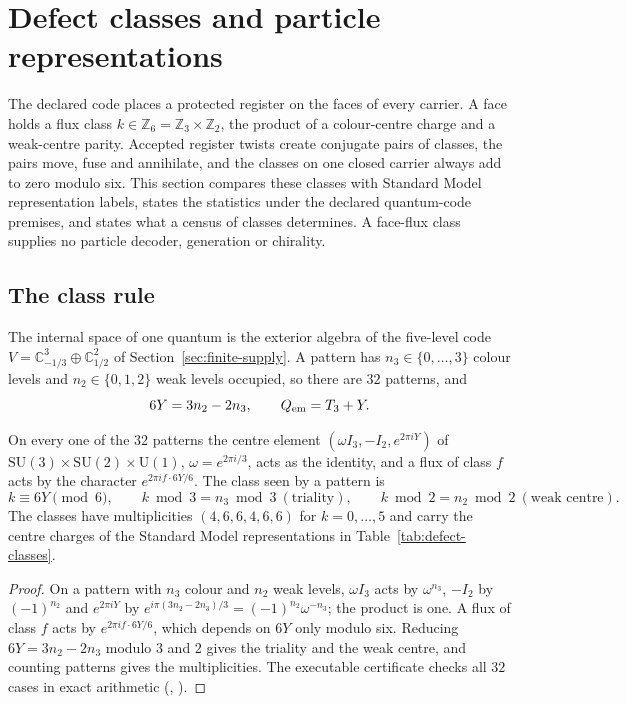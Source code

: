 \section{Defect classes and particle representations}
\label{sec:defect-particle-classes}

The declared code places a protected register on the faces of every carrier. A face holds a
flux class $k\in\mathbb Z_6=\mathbb Z_3\times\mathbb Z_2$, the product of a
colour-centre charge and a weak-centre parity. Accepted register twists create
conjugate pairs of classes, the pairs move, fuse and annihilate, and the classes on one
closed carrier always add to zero modulo six. This section compares these classes with
Standard Model representation labels, states the statistics under the declared
quantum-code premises, and states what a census of classes determines. A face-flux class
supplies no particle decoder, generation or chirality.

\subsection{The class rule}

The internal space of one quantum is the exterior algebra of the five-level code
$V=\mathbb C^3_{-1/3}\oplus\mathbb C^2_{1/2}$ of Section~\ref{sec:finite-supply}. A
pattern has $n_3\in\{0,\dots,3\}$ colour levels and $n_2\in\{0,1,2\}$ weak levels
occupied, so there are $32$ patterns, and
\[
 6Y=3n_2-2n_3,\qquad Q_{\rm em}=T_3+Y .
\]

\begin{theorem}
\label{thm:defect-particle-classes}
On every one of the $32$ patterns the centre element
$(\omega I_3,-I_2,e^{2\pi iY})$ of $\mathrm{SU}(3)\times\mathrm{SU}(2)\times\mathrm U(1)$,
$\omega=e^{2\pi i/3}$, acts as the identity, and a flux of class $f$ acts by the
character $e^{2\pi i f\cdot 6Y/6}$. The class seen by a pattern is
\[
 k\equiv 6Y \pmod 6,\qquad k\bmod 3=n_3\bmod 3\ (\text{triality}),\qquad
 k\bmod 2=n_2\bmod 2\ (\text{weak centre}).
\]
The classes have multiplicities $(4,6,6,4,6,6)$ for $k=0,\dots,5$ and carry the
centre charges of the Standard Model representations in Table~\ref{tab:defect-classes}.
\end{theorem}

\begin{proof}
On a pattern with $n_3$ colour and $n_2$ weak levels, $\omega I_3$ acts by $\omega^{n_3}$,
$-I_2$ by $(-1)^{n_2}$ and $e^{2\pi iY}$ by $e^{i\pi(3n_2-2n_3)/3}=(-1)^{n_2}\omega^{-n_3}$; the
product is one. A flux of class $f$ acts by $e^{2\pi if\cdot 6Y/6}$, which depends on $6Y$ only
modulo six. Reducing $6Y=3n_2-2n_3$ modulo $3$ and $2$ gives the triality and the weak centre,
and counting patterns gives the multiplicities. The executable certificate checks all
$32$ cases in exact arithmetic (, \cite{ophrepo}).
\end{proof}

